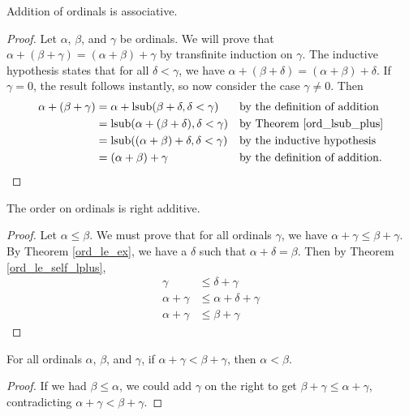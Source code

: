 \documentclass[../../math.tex]{subfiles}
\begin{document}
\begin{instance}
    Addition of ordinals is associative.
\end{instance}
\begin{proof}
    Let $\alpha$, $\beta$, and $\gamma$ be ordinals.  We will prove that $\alpha
    + (\beta + \gamma) = (\alpha + \beta) + \gamma$ by transfinite induction on
    $\gamma$.  The inductive hypothesis states that for all $\delta < \gamma$,
    we have $\alpha + (\beta + \delta) = (\alpha + \beta) + \delta$.  If $\gamma
    = 0$, the result follows instantly, so now consider the case $\gamma \neq
    0$.  Then
    \begin{align*}
        \alpha + (\beta + \gamma)
        &= \alpha + \operatorname{lsub}(\beta + \delta, \delta < \gamma)
            &&\text{by the definition of addition} \\
        &= \operatorname{lsub}(\alpha + (\beta + \delta), \delta < \gamma)
            &&\text{by Theorem \ref{ord_lsub_plus}} \\
        &= \operatorname{lsub}((\alpha + \beta) + \delta, \delta < \gamma)
            &&\text{by the inductive hypothesis} \\
        &= (\alpha + \beta) + \gamma
            &&\text{by the definition of addition.} \\
    \end{align*}
\end{proof}

\begin{instance}
    The order on ordinals is right additive.
\end{instance}
\begin{proof}
    Let $\alpha \leq \beta$.  We must prove that for all ordinals $\gamma$, we
    have $\alpha + \gamma \leq \beta + \gamma$.  By Theorem \ref{ord_le_ex}, we
    have a $\delta$ such that $\alpha + \delta = \beta$.  Then by Theorem
    \ref{ord_le_self_lplus},
    \begin{align*}
        \gamma &\leq \delta + \gamma \\
        \alpha + \gamma &\leq \alpha + \delta + \gamma \\
        \alpha + \gamma &\leq \beta + \gamma
    \end{align*}
\end{proof}

\begin{theorem} \label{ord_lt_plus_rcancel}
    For all ordinals $\alpha$, $\beta$, and $\gamma$, if $\alpha + \gamma <
    \beta + \gamma$, then $\alpha < \beta$.
\end{theorem}
\begin{proof}
    If we had $\beta \leq \alpha$, we could add $\gamma$ on the right to get
    $\beta + \gamma \leq \alpha + \gamma$, contradicting $\alpha + \gamma <
    \beta + \gamma$.
\end{proof}
\end{document}
